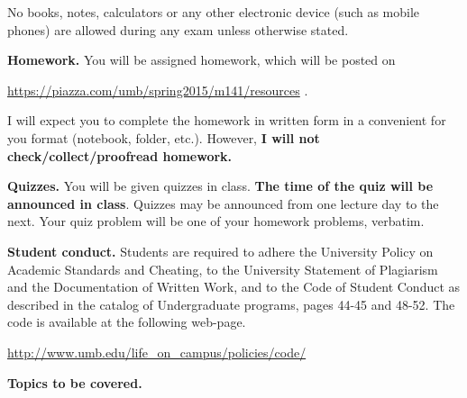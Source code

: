\documentclass{article}
\begin{document}
No books, notes, calculators or any other electronic device (such as mobile phones) are allowed during any exam unless otherwise stated.

\medskip
\noindent \textbf{Homework.} You will be assigned homework, which will be posted on

\url{https://piazza.com/umb/spring2015/m141/resources} \quad \quad \quad .

\noindent I will expect you to complete the homework in written form in a convenient for you format (notebook, folder, etc.). However, \textbf{I will not check/collect/proofread homework.} 
 
\medskip
\noindent \textbf{Quizzes.} You will be given quizzes in class. \textbf{The time of the quiz will be announced in class}. Quizzes may be announced from one lecture day to the next. Your quiz problem will be one of your homework problems, verbatim. 

\medskip
\noindent \textbf{Student conduct.} Students  are required to adhere the University Policy on Academic Standards and Cheating, to the University Statement of Plagiarism and the Documentation of Written Work, and to the Code of Student Conduct as described in the catalog of Undergraduate programs, pages 44-45 and 48-52. The code is available at the following web-page.

\noindent\url{http://www.umb.edu/life_on_campus/policies/code/}

\medskip
\noindent \textbf{Topics to be covered.} 
\end{document}
